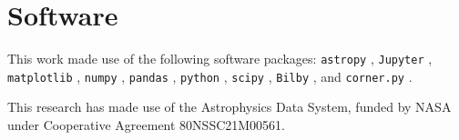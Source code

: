 \documentclass[linenumbers,trackchanges,twocolumn]{aastex701}
\begin{document}
\begin{acknowledgments}

\end{acknowledgments}



%
\facilities{}

\section{Software}

This work made use of the following software packages: \texttt{astropy} \citep{astropy:2013, astropy:2018, astropy:2022}, \texttt{Jupyter} \citep{2007CSE.....9c..21P, kluyver2016jupyter}, \texttt{matplotlib} \citep{Hunter:2007}, \texttt{numpy} \citep{numpy}, \texttt{pandas} \citep{mckinney-proc-scipy-2010, pandas_17229934}, \texttt{python} \citep{python}, \texttt{scipy} \citep{2020SciPy-NMeth, scipy_17101542}, \texttt{Bilby} \citep{bilby_paper, bilby_paper_2, Bilby_17314023}, and \texttt{corner.py} \citep{corner-Foreman-Mackey-2016, corner.py_14209694}.

This research has made use of the Astrophysics Data System, funded by NASA under Cooperative Agreement 80NSSC21M00561.
\end{document}
